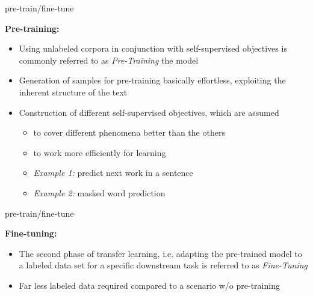 \documentclass[11pt,compress,t,notes=noshow, xcolor=table]{beamer}
\begin{document}

\begin{vbframe}{pre-train/fine-tune}

\vfill

\textbf{Pre-training:}

	\begin{itemize}
		\item Using unlabeled corpora in conjunction with self-supervised objectives 
					is commonly referred to as \textit{Pre-Training} the model
		\item Generation of samples for pre-training basically effortless, exploiting 
					the inherent structure of the text
		\item Construction of different self-supervised objectives, which are assumed
			\begin{itemize}
				\item to cover different phenomena better than the others
				\item to work more efficiently for learning
				\item \textit{Example 1:} predict next work in a sentence
				\item \textit{Example 2:} masked word prediction
			\end{itemize}
	\end{itemize}
	
\vfill

\end{vbframe}


\begin{vbframe}{pre-train/fine-tune}

\vfill

\textbf{Fine-tuning:}

	\begin{itemize}
		\item The second phase of transfer learning, i.e. adapting the pre-trained model
					to a labeled data set for a specific downstream task is referred to as \textit{Fine-Tuning}
		\item Far less labeled data required compared to a scenario w/o pre-training
	\end{itemize}
	
\vfill

\end{vbframe}
\end{document}
